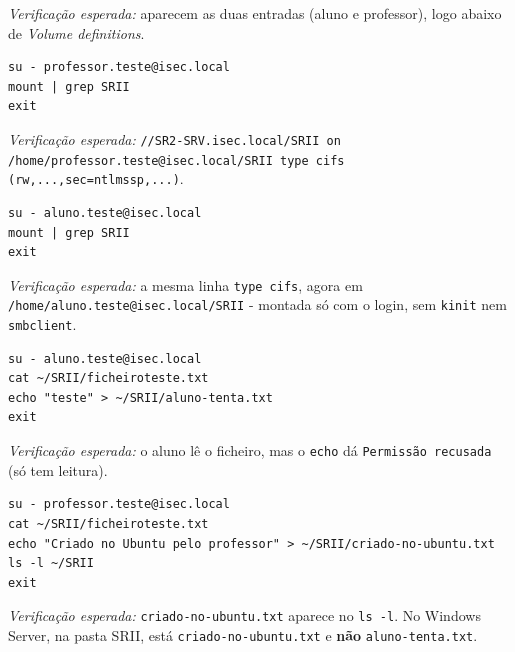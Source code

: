 \emph{Verificação esperada:} aparecem as duas entradas (aluno e professor), logo abaixo de \emph{Volume definitions}.


\begin{lstlisting}[style=bashstyle]
su - professor.teste@isec.local
mount | grep SRII
exit
\end{lstlisting}

\emph{Verificação esperada:} \texttt{/\allowbreak{}/\allowbreak{}SR2-SRV.isec.local/\allowbreak{}SRII on /\allowbreak{}home/\allowbreak{}professor.teste@isec.local/\allowbreak{}SRII type cifs (rw,\allowbreak{}...,\allowbreak{}sec=ntlmssp,\allowbreak{}...)}.


\begin{lstlisting}[style=bashstyle]
su - aluno.teste@isec.local
mount | grep SRII
exit
\end{lstlisting}

\emph{Verificação esperada:} a mesma linha \texttt{type cifs}, agora em \texttt{/\allowbreak{}home/\allowbreak{}aluno.teste@isec.local/\allowbreak{}SRII} - montada só com o login, sem \texttt{kinit} nem \texttt{smbclient}.


\begin{lstlisting}[style=bashstyle]
su - aluno.teste@isec.local
cat ~/SRII/ficheiroteste.txt
echo "teste" > ~/SRII/aluno-tenta.txt
exit
\end{lstlisting}

\emph{Verificação esperada:} o aluno lê o ficheiro, mas o \texttt{echo} dá \texttt{Permissão recusada} (só tem leitura).


\begin{lstlisting}[style=bashstyle]
su - professor.teste@isec.local
cat ~/SRII/ficheiroteste.txt
echo "Criado no Ubuntu pelo professor" > ~/SRII/criado-no-ubuntu.txt
ls -l ~/SRII
exit
\end{lstlisting}

\emph{Verificação esperada:} \texttt{criado-no-ubuntu.txt} aparece no \texttt{ls -l}. No Windows Server, na pasta SRII, está \texttt{criado-no-ubuntu.txt} e \textbf{não} \texttt{aluno-tenta.txt}.

